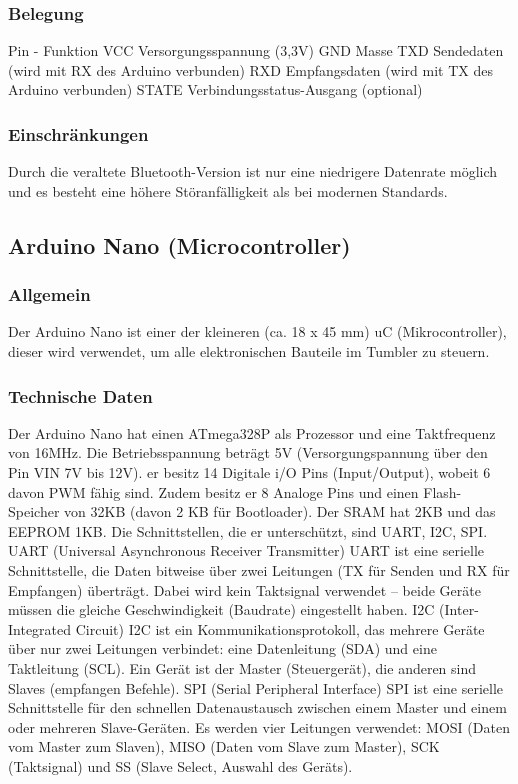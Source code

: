 \subsubsection{Belegung}
Pin	-	Funktion
VCC	Versorgungsspannung (3,3V)
GND	Masse
TXD	Sendedaten (wird mit RX des Arduino verbunden)
RXD	Empfangsdaten (wird mit TX des Arduino verbunden)
STATE	Verbindungsstatus-Ausgang (optional)

\subsubsection{Einschränkungen}
Durch die veraltete Bluetooth-Version ist nur eine niedrigere Datenrate möglich und es besteht eine höhere Störanfälligkeit als bei modernen Standards.
%
\subsection{Arduino Nano (Microcontroller)}
%
\subsubsection{Allgemein}
Der Arduino Nano ist einer der kleineren (ca. 18 x 45 mm) uC (Mikrocontroller), dieser wird verwendet, um alle elektronischen Bauteile im Tumbler zu steuern.
\subsubsection{Technische Daten}
Der Arduino Nano hat einen ATmega328P als Prozessor und eine Taktfrequenz von 16MHz. Die Betriebsspannung beträgt 5V (Versorgungspannung über den Pin VIN 7V bis 12V). 
er besitz 14 Digitale i/O Pins (Input/Output), wobeit 6 davon PWM fähig sind. Zudem besitz er 8 Analoge Pins und einen Flash-Speicher von 32KB (davon 2 KB für Bootloader). 
Der SRAM hat 2KB und das EEPROM 1KB. Die Schnittstellen, die er unterschützt, sind UART, I2C, SPI.
UART (Universal Asynchronous Receiver Transmitter)
UART ist eine serielle Schnittstelle, die Daten bitweise über zwei Leitungen (TX für Senden und RX für Empfangen) überträgt. 
Dabei wird kein Taktsignal verwendet – beide Geräte müssen die gleiche Geschwindigkeit (Baudrate) eingestellt haben.
I2C (Inter-Integrated Circuit)
I2C ist ein Kommunikationsprotokoll, das mehrere Geräte über nur zwei Leitungen verbindet: eine Datenleitung (SDA) und eine Taktleitung (SCL). 
Ein Gerät ist der Master (Steuergerät), die anderen sind Slaves (empfangen Befehle).
SPI (Serial Peripheral Interface)
SPI ist eine serielle Schnittstelle für den schnellen Datenaustausch zwischen einem Master und einem oder mehreren Slave-Geräten. 
Es werden vier Leitungen verwendet: MOSI (Daten vom Master zum Slaven), MISO (Daten vom Slave zum Master), SCK (Taktsignal) und SS (Slave Select, Auswahl des Geräts).

